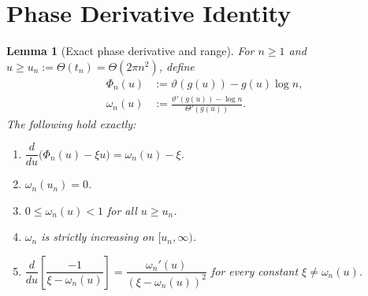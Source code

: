\documentclass[12pt]{amsart}
\newtheorem{lemma}[theorem]{Lemma}
\theoremstyle{definition}
\theoremstyle{remark}
\newcommand{\Th}{\Theta}
\newcommand{\vth}{\vartheta}
\begin{document}
\section{Phase Derivative Identity}\label{sec:phase}

\begin{lemma}[Exact phase derivative and range]\label{lem:phase}
For $n\ge 1$ and $u\ge u_n:=\Th(t_n)=\Th(2\pi n^2)$, define
\begin{align}
  \Phi_n(u) &:= \vth(g(u)) - g(u)\log n, \label{eq:Phin}\\
  \omega_n(u) &:= \frac{\vth'(g(u))-\log n}{\Th'(g(u))}. \label{eq:omegan}
\end{align}
The following hold exactly:
\begin{enumerate}
\item[\rm(a)] $\dfrac{d}{du}\bigl(\Phi_n(u)-\xi u\bigr)
              = \omega_n(u)-\xi$.
\item[\rm(b)] $\omega_n(u_n)=0$.
\item[\rm(c)] $0\le\omega_n(u)<1$ for all $u\ge u_n$.
\item[\rm(d)] $\omega_n$ is strictly increasing on $[u_n,\infty)$.
\item[\rm(e)] $\dfrac{d}{du}\!\left[\dfrac{-1}{\xi-\omega_n(u)}\right]
              =\dfrac{\omega_n'(u)}{(\xi-\omega_n(u))^2}$
              for every constant $\xi\ne\omega_n(u)$.
\end{enumerate}
\end{lemma}
\end{document}
